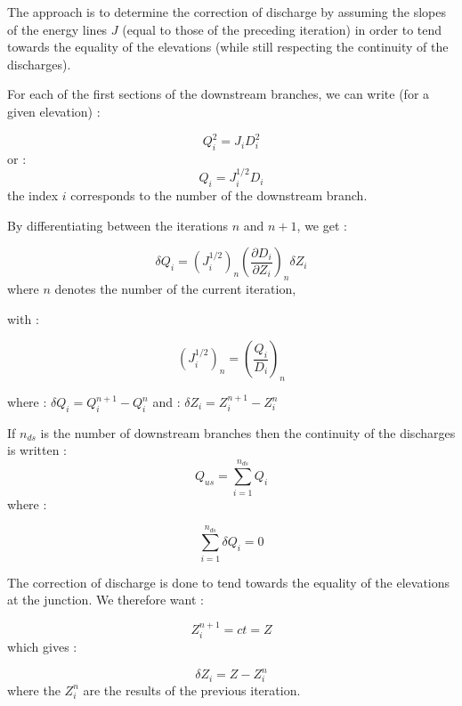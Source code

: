 The approach is to determine the correction of discharge by assuming the slopes of the energy lines $J$ (equal to those of the preceding iteration) in order to tend towards the equality of the elevations (while still respecting the continuity of the discharges).

For each of the first sections of the downstream branches, we can write (for a given elevation) :

\begin{equation}
 Q_{i}^2 = J_i D_{i}^2
\end{equation}
or :
\begin{equation}
 Q_{i} = J_{i}^{1/2} D_{i}
\end{equation}
the index $i$ corresponds to the number of the downstream branch.

By differentiating between the iterations $n$ and $n+1$, we get :

\begin{equation}
 \label{i1}
 \delta Q_i = ( J_{i}^{1/2} )_n \left ( \frac{\partial D_i}{\partial Z_i} \right )_n \delta Z_i
\end{equation}
where $n$ denotes the number of the current iteration,

with :

\begin{equation}
 ( J_{i}^{1/2} )_n = \left ( \frac{Q_i}{D_i} \right )_n
\end{equation}

where : $\delta Q_i = Q_{i}^{n+1} - Q_{i}^{n}$
and : $\delta Z_i = Z_{i}^{n+1} - Z_{i}^{n}$

If $n_{ds}$ is the number of downstream branches then the continuity of the discharges is written  :
\begin{equation}
  Q_{us} = \sum_{i=1}^{n_{ds}} Q_i
\end{equation}
where :

\begin{equation}
 \label{i2}
 \sum_{i=1}^{n_{ds}} \delta Q_i = 0
\end{equation}

The correction of discharge is done to tend towards the equality of the elevations at the junction. We therefore want :

\begin{equation}
 Z_{i}^{n+1} = ct = Z
\end{equation}
which gives :

\begin{equation}
 \label{i3}
  \delta Z_i = Z - Z_{i}^n
\end{equation}
where the $Z_{i}^n$ are the results of the previous iteration.

